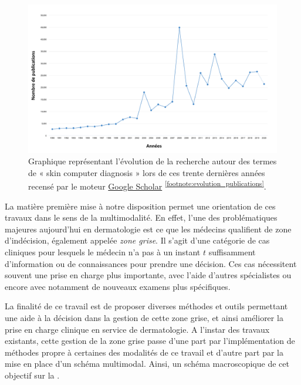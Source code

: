 \begin{figure}[H]
    \centering
    \includegraphics[width=\linewidth]{contents/i_introduction/resources/evolution_publications.pdf}
    \caption{Graphique représentant l'évolution de la recherche autour des termes de « skin computer diagnosis » lors de ces trente dernières années recensé par le moteur \href{https://scholar.google.fr/}{Google Scholar} \textsuperscript{\ref{footnote:evolution_publications}}.}
    \label{fig:evolution_publications}
\end{figure}\par
\addtocounter{footnote}{1}

La matière première mise à notre disposition permet une orientation de ces travaux dans le sens de la multimodalité. En effet, l'une des problématiques majeures aujourd'hui en dermatologie est ce que les médecins qualifient de zone d'indécision, également appelée \textit{zone grise}. Il s'agit d'une catégorie de cas cliniques pour lesquels le médecin n'a pas à un instant $t$ suffisamment d'information ou de connaissances pour prendre une décision. Ces cas nécessitent souvent une prise en charge plus importante, avec l'aide d'autres spécialistes ou encore avec notamment de nouveaux examens plus spécifiques.\par

La finalité de ce travail est de proposer diverses méthodes et outils permettant une aide à la décision dans la gestion de cette zone grise, et ainsi améliorer la prise en charge clinique en service de dermatologie. A l'instar des travaux existants, cette gestion de la zone grise passe d'une part par l'implémentation de méthodes propre à certaines des modalités de ce travail et d'autre part par la mise en place d'un schéma multimodal. Ainsi, un schéma macroscopique de cet objectif sur la .\par
\clearpage

